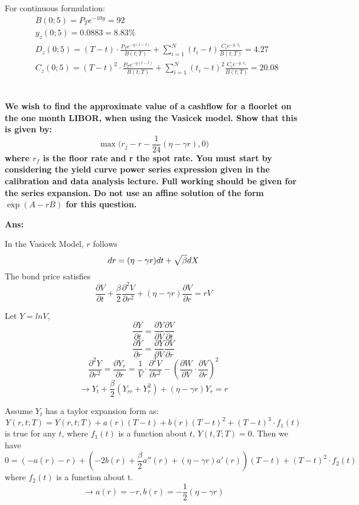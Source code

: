 \documentclass[11pt, notitlepage]{article}
\def\\ln{\mathrm{\ln}}
\def\\exp{\mathrm{\exp}}
\def\\max{\mathrm{\max}}
\def\d{\mathnormal{d}}
\begin{document}
For continuous formulation:
\begin{equation*}
\begin{aligned}
&B(0;5) = P_T e^{-10y}= 92\\
&y_z(0;5) = 0.0883 = 8.83\%\\ 
&D_z(0;5) =(T-t) \cdot \frac{P_T e^{-y(t-t)}}{B(t;T)} + \sum^N_{i=1} (t_i-t) \frac{C_i e^{-y \cdot t_i}}{B(t;T)} =  4.27\\
&C_z(0;5) =(T-t)^2 \cdot \frac{P_T e^{-y(t-t)}}{B(t;T)} + \sum^N_{i=1} (t_i-t)^2 \frac{C_i e^{-y \cdot t_i}}{B(t;T)}= 20.08
\end{aligned}
\end{equation*}

\newpage
\section{}
\color{red}
\textbf {We wish to find the approximate value of a cashflow for a floorlet on the one month LIBOR, when using the Vasicek model. Show that this is given by:
$$\max\bigg(r_j - r -\frac{1}{24}( \eta - \gamma r), 0 \bigg)$$
where $r_f$ is the floor rate and r the spot rate. You must start by considering the yield curve power series expression given in the calibration and data analysis lecture. Full working should be given for the series expansion. Do not use an affine solution of the form $\exp(A-rB)$ for this question.}

\vspace{5mm}
\color{black}
\textbf {Ans:}

In the Vasicek Model, $r$ follows
$$\d r = (\eta - \gamma r)dt + \sqrt{\beta}dX$$
The bond price satisfies
$$ \frac{\partial V}{\partial t} + \frac{\beta}{2} \frac{\partial^2 V}{\partial r^2} + (\eta - \gamma r)\frac{\partial V}{\partial r} = rV$$

Let $Y = lnV$,
$$ \frac{\partial Y}{\partial t} = \frac{\partial Y}{\partial V}\frac{\partial V}{\partial t}$$
$$ \frac{\partial Y}{\partial r} = \frac{\partial Y}{\partial V}\frac{\partial V}{\partial r}$$
$$ \frac{\partial ^2 Y}{\partial r^2} = \frac{\partial Y_r}{\partial r} = \frac{1}{V}\cdot \frac{\partial^2 V}{\partial r^2} - (\frac{\partial W}{\partial V} \cdot \frac{\partial V }{\partial r})^2$$
$$ \to Y_t + \frac{\beta}{2} (Y_{rr} + Y_r ^2) + (\eta-\gamma r)Y_r = r$$

Assume $Y_t$ has a taylor expansion form as:
$$ Y(r,t;T) = Y(r,t;T) + a(r)(T-t) + b(r)(T-t)^2 + (T-t)^3 \cdot f_1(t)$$ is true for any $t$, where $f_1(t)$ is a function about $t$, $Y(t,T;T) = 0$. Then we have
$$ 0 = (-a(r) -r) + (-2b(r) + \frac{\beta}{2}a''(r) + (\eta -\gamma r)a'(r)) (T-t) + (T-t)^2 \cdot f_2(t)$$
where $f_2(t)$ is a function about t. 
$$\to a(r) = -r, b(r) = -\frac{1}{2}(\eta - \gamma r)$$
\end{document}
